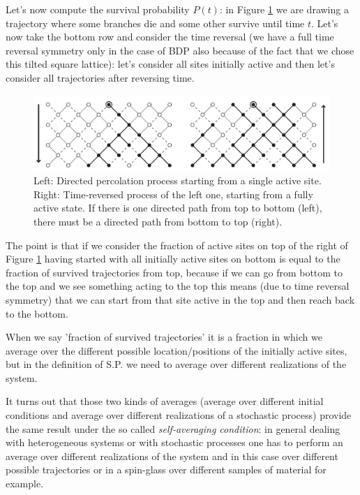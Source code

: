 \documentclass[\main/main.tex]{subfiles}
\begin{document}
Let's now compute the survival probability $P(t)$: in Figure \ref{fig:sp} we are drawing a trajectory where some branches die and some other survive until time $t$. Let's now take the bottom row and consider the time reversal (we have a full time reversal symmetry only in the case of BDP also because of the fact that we chose this tilted square lattice): let's consider all sites initially active and then let's consider all trajectories after reversing time.
   
\begin{figure}[ht]
    \centering
    \includegraphics[width=0.8\linewidth]{Lectures/Images/sp.jpg}
    \caption{Left: Directed percolation process starting from a single active site. Right: Time-reversed process of the left one,
starting from a fully active state. If there is one directed path from top to bottom (left), there must be a directed path
from bottom to top (right).}
    \label{fig:sp}
\end{figure}

The point is that if we consider the fraction of active sites on top of the right of Figure \ref{fig:sp} having started with all initially active sites on bottom is equal to the fraction of survived trajectories from top, because if we can go from bottom to the top and we see something acting to the top this means (due to time reversal symmetry) that we can start from that site active in the top and then reach back to the bottom.

When we say 'fraction of survived trajectories' it is a fraction in which we average over the different possible location/positions of the initially active sites, but in the definition of S.P. we need to average over different realizations of the system.

It turns out that those two kinds of averages (average over different initial conditions and average over different realizations of a stochastic process) provide the same result under the so called \textit{self-averaging condition}: in general dealing with heterogeneous systems or with stochastic processes one has to perform an average over different realizations of the system and in this case over different possible trajectories or in a spin-glass over different samples of material for example.
\end{document}
